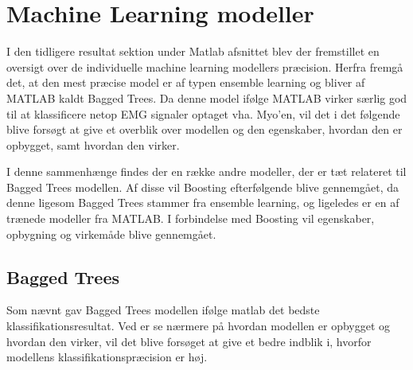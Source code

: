\thispagestyle{fancy}
\chapter{Machine Learning modeller}
\label{chp:mlm}
I den tidligere resultat sektion under Matlab afsnittet blev der fremstillet en oversigt over de individuelle machine learning modellers præcision. Herfra fremgå det, at den mest præcise model er af typen ensemble learning og bliver af MATLAB kaldt Bagged Trees. Da denne model ifølge MATLAB virker særlig god til at klassificere netop EMG signaler optaget vha. Myo'en, vil det i det følgende blive forsøgt at give et overblik over modellen og den egenskaber, hvordan den er opbygget, samt hvordan den virker. 

I denne sammenhænge findes der en række andre modeller, der er tæt relateret til Bagged Trees modellen. Af disse vil Boosting efterfølgende blive gennemgået, da denne ligesom Bagged Trees stammer fra ensemble learning, og ligeledes er en af trænede modeller fra MATLAB. I forbindelse med Boosting vil egenskaber, opbygning og virkemåde blive gennemgået.

\section{Bagged Trees}
Som nævnt gav Bagged Trees modellen ifølge matlab det bedste klassifikationsresultat.  Ved er se nærmere på hvordan modellen er opbygget og hvordan den virker, vil det blive forsøget at give et bedre indblik i, hvorfor modellens klassifikationspræcision er høj. 

